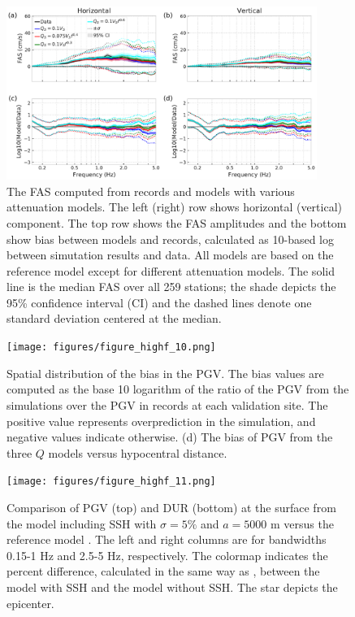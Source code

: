 \begin{figure}[!ht]
  \centering
  \includegraphics[width=0.9\textwidth,height=0.9\textheight,keepaspectratio]{figures/figure_highf_9.pdf}
  \caption{The FAS computed from records and models with various attenuation models. The left (right) row shows horizontal (vertical) component. The top row shows the FAS amplitudes and the bottom show bias between models and records, calculated as 10-based log between simutation results and data. All models are based on the reference model except for different attenuation models. The solid line is the median FAS over all 259 stations; the shade depicts the 95\% confidence interval (CI) and the dashed lines denote one standard deviation centered at the median.
  }
  \label{fig:highf-9}
\end{figure}
\clearpage

\begin{figure}[!ht]
  \centering
  \texttt{[image: figures/figure\_highf\_10.png]}
  \caption{Spatial distribution of the bias in the PGV. The bias values are computed as the base 10 logarithm of the ratio of the PGV from the simulations over the PGV in records at each validation site. The positive value represents overprediction in the simulation, and negative values indicate otherwise. (d) The bias of PGV from the three $Q$ models versus hypocentral distance.
  }
  \label{fig:highf-10}
\end{figure}
\clearpage


\begin{figure}[!ht]
  \centering
  \texttt{[image: figures/figure\_highf\_11.png]}
  \caption{Comparison of PGV (top) and DUR (bottom) at the surface from the model including SSH with $\sigma = 5\%$ and $a = 5000$ m versus the reference model . The left and right columns are for bandwidths 0.15-1 Hz and 2.5-5 Hz, respectively. The colormap indicates the percent difference, calculated in the same way as , between the model with SSH and the model without SSH. The star depicts the epicenter.
  }
  \label{fig:highf-11}
\end{figure}
\clearpage

